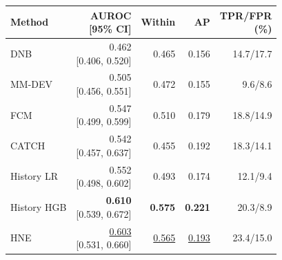 \begin{tabular*}{\linewidth}{@{\extracolsep{\fill}}lrrrr@{}}
\toprule
Method & \shortstack{AUROC\\{}[95\% CI]} & Within & AP & \shortstack{TPR/FPR\\(\%)} \\
\midrule
DNB & \shortstack[r]{0.462 \\ {}[0.406, 0.520]} & 0.465 & 0.156 & 14.7/17.7 \\
MM-DEV & \shortstack[r]{0.505 \\ {}[0.456, 0.551]} & 0.472 & 0.155 & 9.6/8.6 \\
FCM & \shortstack[r]{0.547 \\ {}[0.499, 0.599]} & 0.510 & 0.179 & 18.8/14.9 \\
CATCH & \shortstack[r]{0.542 \\ {}[0.457, 0.637]} & 0.455 & 0.192 & 18.3/14.1 \\
History LR & \shortstack[r]{0.552 \\ {}[0.498, 0.602]} & 0.493 & 0.174 & 12.1/9.4 \\
History HGB & \shortstack[r]{\textbf{0.610} \\ {}[0.539, 0.672]} & \textbf{0.575} & \textbf{0.221} & 20.3/8.9 \\
\cellcolor{hnegray}HNE & \shortstack[r]{\underline{0.603} \\ {}[0.531, 0.660]} & \underline{0.565} & \underline{0.193} & 23.4/15.0 \\
\bottomrule
\end{tabular*}